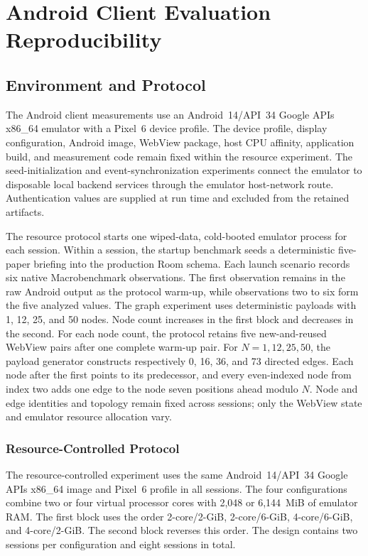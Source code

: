 
\chapter{Android Client Evaluation Reproducibility}
\label{app:android-evaluation}

\section{Environment and Protocol}

The Android client measurements use an Android~14/API~34 Google APIs
x86\_64 emulator with a Pixel~6 device profile. The device profile, display
configuration, Android image, WebView package, host CPU affinity, application
build, and measurement code remain fixed within the resource experiment. The
seed-initialization and event-synchronization experiments connect the emulator
to disposable local backend services through the emulator host-network route.
Authentication values are supplied at run time and excluded from the retained
artifacts.

The resource protocol starts one wiped-data, cold-booted emulator process for
each session. Within a session, the startup benchmark seeds a deterministic
five-paper briefing into the production Room schema. Each launch scenario
records six native Macrobenchmark observations. The first observation remains
in the raw Android output as the protocol warm-up, while observations two to
six form the five analyzed values. The graph experiment uses deterministic
payloads with 1, 12, 25, and 50 nodes. Node count increases in the first block
and decreases in the second. For each node count, the protocol retains five
new-and-reused WebView pairs after one complete warm-up pair.
For \(N=1,12,25,50\), the payload generator constructs respectively
0, 16, 36, and 73 directed edges. Each node after the first points to its
predecessor, and every even-indexed node from index two adds one edge to the
node seven positions ahead modulo \(N\). Node and edge identities and topology
remain fixed across sessions; only the WebView state and emulator resource
allocation vary.

\subsection{Resource-Controlled Protocol}

The resource-controlled experiment uses the same Android~14/API~34 Google
APIs x86\_64 image and Pixel~6 profile in all sessions.
The four configurations combine two or four virtual processor cores with
2{,}048 or 6{,}144~MiB of emulator RAM.
The first block uses the order 2-core/2-GiB, 2-core/6-GiB,
4-core/6-GiB, and 4-core/2-GiB. The second block reverses this order. The
design contains two sessions per configuration and eight sessions in total.

